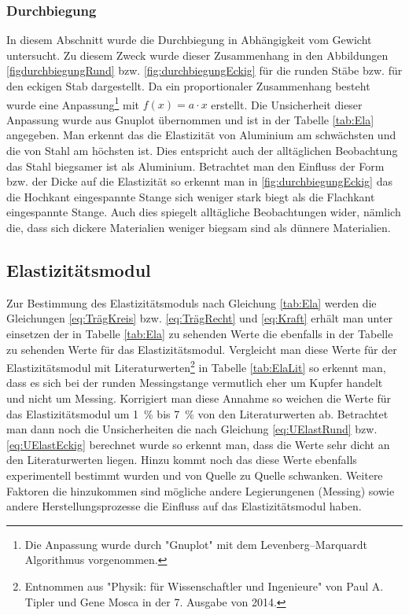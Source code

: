 \subsubsection*{Durchbiegung}
In diesem Abschnitt wurde die Durchbiegung in Abhängigkeit vom Gewicht untersucht. Zu diesem Zweck wurde dieser Zusammenhang in den Abbildungen \ref{figdurchbiegungRund} bzw. \ref{fig:durchbiegungEckig}  für die runden Stäbe bzw. für den eckigen Stab dargestellt. Da ein proportionaler Zusammenhang besteht wurde eine Anpassung\footnote{Die Anpassung wurde durch "Gnuplot" mit dem Levenberg–Marquardt Algorithmus vorgenommen.  }  mit $f(x)=a \cdot x$ erstellt. Die Unsicherheit dieser Anpassung wurde aus Gnuplot übernommen und ist in der Tabelle \ref{tab:Ela} angegeben.
Man erkennt das die Elastizität von Aluminium am schwächsten und die von Stahl am höchsten ist. Dies entspricht auch der alltäglichen Beobachtung das Stahl biegsamer ist als Aluminium.
Betrachtet man den Einfluss der Form bzw. der Dicke auf die Elastizität so erkennt man in \ref{fig:durchbiegungEckig} das die Hochkant eingespannte Stange sich weniger stark biegt als die Flachkant eingespannte Stange. Auch dies spiegelt alltägliche Beobachtungen wider, nämlich die, dass sich dickere Materialien weniger biegsam sind als dünnere Materialien.

\subsection{Elastizitätsmodul}

Zur Bestimmung des Elastizitätsmoduls nach Gleichung \ref{tab:Ela} werden die Gleichungen \ref{eq:TrägKreis} bzw. \ref{eq:TrägRecht} und \ref{eq:Kraft} erhält man unter einsetzen der in Tabelle \ref{tab:Ela} zu sehenden Werte die ebenfalls in der Tabelle zu sehenden Werte für das Elastizitätsmodul.
Vergleicht man diese Werte für der Elastizitätsmodul mit Literaturwerten\footnote{Entnommen aus "Physik: für Wissenschaftler und Ingenieure" von Paul A. Tipler und Gene Mosca in der 7. Ausgabe von 2014.} in Tabelle \ref{tab:ElaLit} so erkennt man, dass es sich bei der runden Messingstange vermutlich eher um Kupfer handelt und nicht um Messing. Korrigiert man diese Annahme so weichen die Werte für das Elastizitätsmodul um \SI{1}{\percent} bis \SI{7}{\percent} von den Literaturwerten ab. Betrachtet man dann noch die Unsicherheiten die nach Gleichung \ref{eq:UElastRund} bzw. \ref{eq:UElastEckig} berechnet wurde so erkennt man, dass die Werte sehr dicht an den Literaturwerten liegen. Hinzu kommt noch das diese Werte ebenfalls experimentell bestimmt wurden und von Quelle zu Quelle schwanken. Weitere Faktoren die hinzukommen sind mögliche andere Legierungenen (Messing) sowie andere Herstellungsprozesse die Einfluss auf das Elastizitätsmodul haben. 

